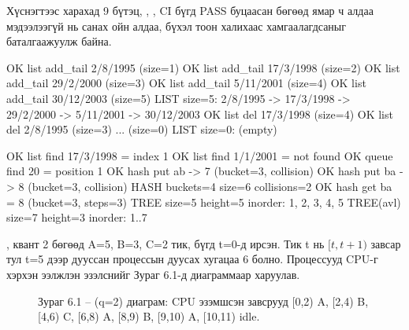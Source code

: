 Хүснэгтээс харахад 9 бүтэц, , , CI бүгд PASS буцаасан бөгөөд  ямар ч алдаа мэдээлээгүй нь санах ойн алдаа, бүхэл тоон халихаас хамгаалагдсаныг баталгаажуулж байна.


\noindent\begin{minipage}[t]{0.48\textwidth}
\begin{codeblock}
OK list add_tail 2/8/1995 (size=1)
OK list add_tail 17/3/1998 (size=2)
OK list add_tail 29/2/2000 (size=3)
OK list add_tail 5/11/2001 (size=4)
OK list add_tail 30/12/2003 (size=5)
LIST size=5: 2/8/1995 -> 17/3/1998
  -> 29/2/2000 -> 5/11/2001 -> 30/12/2003
OK list del 17/3/1998 (size=4)
OK list del 2/8/1995 (size=3) ... (size=0)
LIST size=0: (empty)
\end{codeblock}
\end{minipage}\hfill
\begin{minipage}[t]{0.48\textwidth}
\begin{codeblock}
OK list find 17/3/1998 = index 1
OK list find 1/1/2001 = not found
OK queue find 20 = position 1
OK hash put ab -> 7 (bucket=3, collision)
OK hash put ba -> 8 (bucket=3, collision)
HASH buckets=4 size=6 collisions=2
OK hash get ba = 8 (bucket=3, steps=3)
TREE size=5 height=5 inorder: 1, 2, 3, 4, 5
TREE(avl) size=7 height=3 inorder: 1..7
\end{codeblock}
\end{minipage}


, квант 2 бөгөөд A=5, B=3, C=2 тик, бүгд t=0-д ирсэн. Тик t нь $[t, t+1)$ завсар тул t=5 дээр дууссан процессын дуусах хугацаа 6 болно. Процессууд CPU-г хэрхэн ээлжлэн эзэлснийг Зураг 6.1-д  диаграммаар харуулав.

\begin{figure}[H]
\centering
{}
\caption*{Зураг 6.1 --  (q=2)  диаграм: CPU эзэмшсэн завсрууд [0,2) A, [2,4) B, [4,6) C, [6,8) A, [8,9) B, [9,10) A, [10,11) idle.}
\end{figure}

